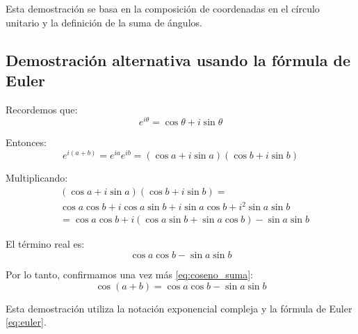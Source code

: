 Esta demostración se basa en la composición de coordenadas en el círculo unitario y la definición de la suma de ángulos.

\subsection*{Demostración alternativa usando la fórmula de Euler}
Recordemos que:
\begin{equation}\label{eq:euler}
e^{i\theta} = \cos\theta + i\sin\theta
\end{equation}

Entonces:
\begin{equation}\label{eq:euler_suma}
e^{i(a+b)} = e^{ia} e^{ib} = (\cos a + i \sin a)(\cos b + i \sin b)
\end{equation}

Multiplicando:
\begin{align*}
& (\cos a + i \sin a)(\cos b + i \sin b) = \\
& \cos a \cos b + i \cos a \sin b + i \sin a \cos b + i^2 \sin a \sin b \\
& = \cos a \cos b + i(\cos a \sin b + \sin a \cos b) - \sin a \sin b
\end{align*}

El término real es:
\begin{equation*}
\cos a \cos b - \sin a \sin b
\end{equation*}

Por lo tanto, confirmamos una vez más \eqref{eq:coseno_suma}:
\begin{equation}\label{eq:coseno_suma_euler}
\cos(a+b) = \cos a \cos b - \sin a \sin b
\end{equation}

Esta demostración utiliza la notación exponencial compleja y la fórmula de Euler \eqref{eq:euler}.

